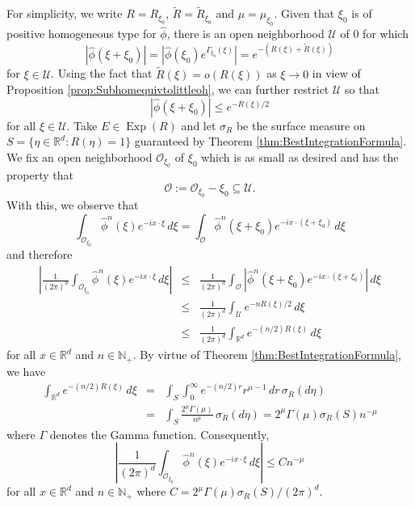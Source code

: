 \documentclass[smallextended]{svjour3}
\theoremstyle{remark}
\renewenvironment{proof}[1][\proofname]{\renewcommand\xproofname{#1}\xproof}{\endxproof}
\newcommand\Exp{\operatorname{Exp}}
\begin{document}
\begin{proof}
For simplicity, we write $R=R_{\xi_0}$, $\widetilde{R}=\widetilde{R}_{\xi_0}$ and $\mu=\mu_{\xi_0}$. Given that $\xi_0$ is of positive homogeneous type for $\widehat{\phi}$, there is an open neighborhood $\mathcal{U}$ of $0$ for which
\begin{equation*}
    \left|\widehat{\phi}(\xi+\xi_0)\right|=\left|\widehat{\phi}(\xi_0)e^{\Gamma_{\xi_0}(\xi)}\right|=e^{-\left(R(\xi)+\widetilde{R}(\xi)\right)}
\end{equation*}
for $\xi\in \mathcal{U}$. Using the fact that $\widetilde{R}(\xi)=o(R(\xi))$ as $\xi\to 0$ in view of Proposition \ref{prop:Subhomequivtolittleoh}, we can further restrict $\mathcal{U}$ so that
\begin{equation*}
    \left|\widehat{\phi}(\xi+\xi_0)\right|\leq e^{-R(\xi)/2}
\end{equation*}
for all $\xi\in\mathcal{U}$. Take $E\in\Exp(R)$ and let $\sigma_R$ be the surface measure on  $S=\{\eta\in\mathbb{R}^d:R(\eta)=1\}$ guaranteed by Theorem \ref{thm:BestIntegrationFormula}. We fix an open neighborhood $\mathcal{O}_{\xi_0}$ of $\xi_0$ which is as small as desired and has the property that
\begin{equation*}
    \mathcal{O}:=\mathcal{O}_{\xi_0}-\xi_0\subseteq\mathcal{U}.
\end{equation*}
With this, we observe that
\begin{equation}\label{eq:WlogCenterAtZero}
\int_{\mathcal{O}_{\xi_0}}\widehat{\phi}^n(\xi)e^{-ix\cdot\xi}\,d\xi=\int_{\mathcal{O}}\widehat{\phi}^n(\xi+\xi_0)e^{-ix\cdot(\xi+\xi_0)}\,d\xi
\end{equation}
and therefore
\begin{eqnarray*}
    \left|\frac{1}{(2\pi)^d}\int_{\mathcal{O}_{\xi_0}}\widehat{\phi}^n(\xi)e^{-ix\cdot\xi}\,d\xi\right|&\leq& \frac{1}{(2\pi)^d}\int_{\mathcal{O}}\left|\widehat{\phi}^n(\xi+\xi_0)e^{-i x\cdot(\xi+\xi_0)}\right|\,d\xi\\
    &\leq& \frac{1}{(2\pi)^d}\int_{\mathcal{U}}e^{-nR(\xi)/2}\,d\xi\\
    &\leq&\frac{1}{(2\pi)^d}\int_{\mathbb{R}^d} e^{-(n/2)R(\xi)}\,d\xi
\end{eqnarray*}
for all $x\in\mathbb{R}^d$ and $n\in\mathbb{N}_+$. By virtue of Theorem \ref{thm:BestIntegrationFormula}, we have
\begin{eqnarray*}
\int_{\mathbb{R}^d}e^{-(n/2)R(\xi)}\,d\xi&=&\int_S \int_0^\infty e^{-(n/2)r}r^{\mu-1}\,dr\,\sigma_R(d\eta)\\
&=&\int_S \frac{2^\mu\Gamma(\mu)}{n^{\mu}}\,\sigma_R(d\eta)=2^\mu\Gamma(\mu)\sigma_R(S)n^{-\mu}
\end{eqnarray*}
where $\Gamma$ denotes the Gamma function. Consequently,
\begin{equation*}
    \left|\frac{1}{(2\pi)^d}\int_{\mathcal{O}_{\xi_0}}\widehat{\phi}^n(\xi)e^{-ix\cdot\xi}\,d\xi\right|\leq C n^{-\mu}
\end{equation*}
for all $x\in\mathbb{R}^d$ and $n\in\mathbb{N}_+$ where $C=2^\mu \Gamma(\mu)\sigma_R(S)/(2\pi)^d.$
\end{proof}
\end{document}
